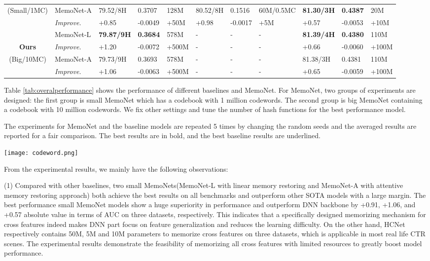 \documentclass[sigconf,authorversion]{acmart}
\begin{document}
\begin{table*}
\begin{tabular}{c|l|lllllllll}
(Small/1MC)&  MemoNet-A & 79.52/8H & 0.3707 &128M  & 80.52/8H &0.1516 &60M/0.5MC & \textbf{81.30/3H}  & \textbf{0.4387} &20M    \\
& \quad \emph{ Improve.} & +0.85 & -0.0049 &+50M  & +0.98 &-0.0017 &+5M & +0.57  & -0.0053 &+10M    \\
 \midrule 
 &   MemoNet-L & \textbf{79.87/9H} & \textbf{0.3684} &578M  & - &- &- & \textbf{81.39/4H} & \textbf{0.4380} &  110M  \\
\textbf{Ours}& \quad \emph{ Improve.} & +1.20 & -0.0072 &+500M  & - &- &- & +0.66  & -0.0060 &+100M    \\
(Big/10MC)&  MemoNet-A & 79.73/9H &0.3693 &578M  & - &- &- & 81.38/3H  & 0.4381 &110M    \\
&  \quad \emph {Improve.} & +1.06 & -0.0063 &+500M  & -&- &- & +0.65  & -0.0059 &+100M    \\
   
\bottomrule
\end{tabular}\label{tab:overalperformance}
\end{table*}

Table \ref{tab:overalperformance} shows the performance of different baselines and MemoNet. For MemoNet, two groups of experiments are designed: the first group is small MemoNet which has a codebook with 1 million codewords. The second group is big MemoNet containing a codebook with 10 million codewords. We fix other settings and tune the number of hash functions for the best performance model.

The experiments for MemoNet and the baseline models are repeated 5 times by changing the random seeds and the averaged results are reported for a fair comparison. The best results are in bold, and the best baseline results are underlined.
\begin{figure*}[h]
  \centering
  \texttt{[image: codeword.png]}
  \caption{Effect of different codeword number in HCNet}
  \Description{}
\end{figure*}
From the experimental results, we mainly have the following observations:

(1) Compared with other baselines, two small MemoNets(MemoNet-L with linear memory restoring and MemoNet-A with attentive memory restoring approach) both achieve the best results on all benchmarks and outperform other SOTA models with a large margin. The best performance small MemoNet models show a huge superiority in performance and outperform DNN backbone by +0.91,  +1.06, and +0.57 absolute value in terms of AUC on three datasets, respectively. This indicates that a specifically designed  memorizing mechanism for cross features indeed makes DNN part focus on feature generalization and reduces the learning difficulty. On the other hand, HCNet respectively contains 50M, 5M and 10M parameters to memorize cross features on three datasets, which is applicable in most real life CTR scenes. The experimental results demonstrate the feasibility of memorizing all cross features with limited resources to greatly boost model performance.
\end{document}
